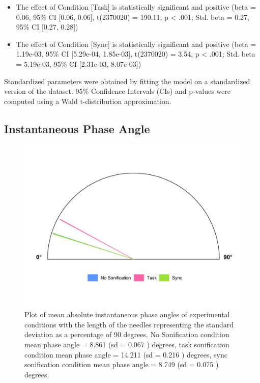 \documentclass[10pt,a4paper,onecolumn]{article}
\providecommand{\tightlist}{%
  \setlength{\itemsep}{0pt}\setlength{\parskip}{0pt}}
\begin{document}
\begin{itemize}
\tightlist
\item
  The effect of Condition {[}Task{]} is statistically significant and positive (beta = 0.06, 95\% CI {[}0.06, 0.06{]}, t(2370020) = 190.11, p \textless{} .001; Std. beta = 0.27, 95\% CI {[}0.27, 0.28{]})
\item
  The effect of Condition {[}Sync{]} is statistically significant and positive (beta = 1.19e-03, 95\% CI {[}5.29e-04, 1.85e-03{]}, t(2370020) = 3.54, p \textless{} .001; Std. beta = 5.19e-03, 95\% CI {[}2.31e-03, 8.07e-03{]})
\end{itemize}

Standardized parameters were obtained by fitting the model on a standardized version of the dataset. 95\% Confidence Intervals (CIs) and p-values were computed using a Wald t-distribution approximation.

\hypertarget{instantaneous-phase-angle}{%
\subsection{Instantaneous Phase Angle}\label{instantaneous-phase-angle}}

\begin{figure}[h]

{\centering \includegraphics[width=1\linewidth]{figures/mean_condition_phase_angles_mean_sd} 

}

\caption{Plot of mean absolute instantaneous phase angles of experimental conditions with the length of the needles representing the standard deviation as a percentage of 90 degrees. No Sonification condition mean phase angle =  8.861 (sd =  0.067 ) degrees, task sonification condition mean phase angle =  14.211 (sd =  0.216 ) degrees, sync sonification condition mean phase angle =  8.749 (sd =  0.075 ) degrees.}\label{fig:mean-instantaneous-phase-angle-circular-plot}
\end{figure}
\end{document}
